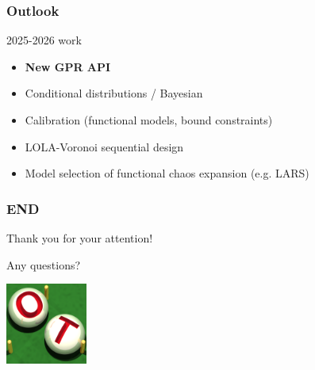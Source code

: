 \documentclass[aspectratio=169]{beamer}
\begin{document}

\begin{frame}
\frametitle{Outlook}
\begin{block}{2025-2026 work}
\begin{itemize}
\item \textbf{New GPR API}
\item Conditional distributions / Bayesian
\item Calibration (functional models, bound constraints)
\item LOLA-Voronoi sequential design
\item Model selection of functional chaos expansion (e.g. LARS)
\end{itemize}
\end{block}
\end{frame}


\begin{frame}
\frametitle{END}

Thank you for your attention!

Any questions?

\begin{center}
\includegraphics[width=0.2\textwidth]{figures/logo-ot-small}
\end{center}

\end{frame}

% 
% 
% 
% 
\end{document}
